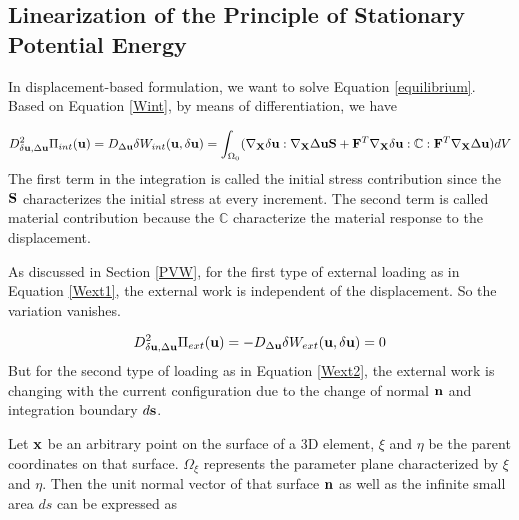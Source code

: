 %
\subsection{Linearization of the Principle of Stationary Potential Energy}
In displacement-based formulation, we want to solve Equation \ref{equilibrium}. Based on Equation \ref{Wint}, by means of differentiation, we have

\begin{equation} \label{Kint}
D^2_{\delta\bold{u}, \Delta\bold{u}}\Pi_{int}(\bold{u}) = D_{\Delta{\bold{u}}}\delta{W_{int}}(\bold{u}, \delta{\bold{u}}) = \int_{\Omega_0}(\nabla_{\bold{X}}\delta\bold{u} : \nabla_{\bold{X}}\Delta\bold{u}\bold{S} + \bold{F}^T\nabla_{\bold{X}}\delta{\bold{u}} : \mathbb{C} : \bold{F}^T \nabla_{\bold{X}}\Delta\bold{u})dV
\end{equation}
The first term in the integration is called the initial stress contribution since the $\bold{S}$ characterizes the initial stress at every increment. The second term is called material contribution because the $\mathbb{C}$ characterize the material response to the displacement.

As discussed in Section \ref{PVW}, for the first type of external loading as in Equation \ref{Wext1}, the external work is independent of the displacement. So the variation vanishes.

\begin{equation} \label{Kext}
D^2_{\delta\bold{u}, \Delta\bold{u}}\Pi_{ext}(\bold{u}) = - D_{\Delta{\bold{u}}}\delta{W_{ext}}(\bold{u}, \delta{\bold{u}}) = 0
\end{equation}
But for the second type of loading as in Equation \ref{Wext2}, the external work is changing with the current configuration due to the change of normal $\bold{n}$ and integration boundary $d\bold{s}$. 

Let $\bold{x}$ be an arbitrary point on the surface of a 3D element, $\xi$ and $\eta$ be the parent coordinates on that surface. $\Omega_{\xi}$ represents the parameter plane characterized by $\xi$ and $\eta$. Then the unit normal vector of that surface $\bold{n}$ as well as the infinite small area $ds$ can be expressed as

